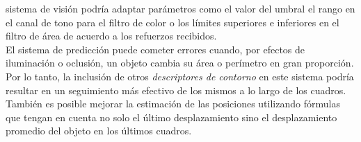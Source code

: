 sistema de visión podría adaptar parámetros como el valor del umbral 
el rango en el canal de tono para el filtro de color o los límites 
superiores e inferiores en el filtro de área de acuerdo a los 
refuerzos recibidos.\\
\indent El sistema de predicción puede cometer errores cuando, por 
efectos de iluminación o oclusión, un objeto cambia su área o 
perímetro en gran proporción. Por lo tanto, la inclusión de otros 
\emph{descriptores de contorno} en este sistema podría resultar en un 
seguimiento más efectivo de los mismos a lo largo de los cuadros. 
También es posible mejorar la estimación de las posiciones utilizando 
fórmulas que tengan en cuenta no solo el último desplazamiento sino 
el desplazamiento promedio del objeto en los últimos cuadros.


